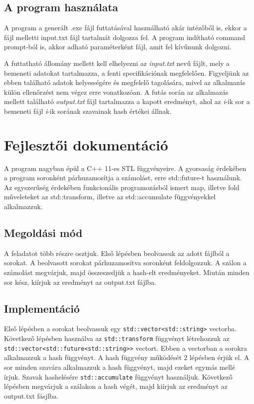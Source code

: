\documentclass[12pt]{article}
\begin{document}
\subsection{A program használata}

A program a generált .exe fájl futtatásával használható akár intézőből is, ekkor a fájl melletti input.txt fájl tartalmát dolgozza fel. A program indítható command prompt-ból is, akkor adható paraméterként fájl, amit fel kívűnunk dolgozni. 

A futtatható állomány mellett kell elhelyezni az \textit{input.txt} nevű fájlt, mely a bemeneti adatokat tartalmazza, a fenti specifikációnak megfelelően. Figyeljünk az ebben található adatok helyességére és megfelelő tagolására, mivel az alkalmazás külön ellenőrzést nem végez erre vonatkozóan. A futás során az alkalmazás mellett található \textit{output.txt} fájl tartalmazza a kapott eredményt, ahol az \textit{i}-ik sor a bemeneti fájl \textit{i}-ik sorának szavainak hash értékei állnak.

\section{Fejlesztői dokumentáció}

A program nagyban épül a C++ 11-es STL függvényeire. A gyorsaság érdekében a program soronként párhuzamosítja a számolást, erre std::future-t használunk. Az egyszerűség érdekében funkcionális programozásból ismert map, illetve fold műveleteket az std::transform, illetve az std::accumulate függvényekkel alkalmazzuk. 

\subsection{Megoldási mód}

A feladatot több részre osztjuk. Első lépésben beolvassuk az adott fájlból a sorokat. A beolvasott sorokat párhuzamosítva soronként feldolgozzuk. A szálon a számolást megvárjuk, majd összeszedjük a hash-elt eredményeket. Miután minden sor kész, kiírjuk az eredményt az output.txt fájlba.

\subsection{Implementáció}

Első lépésben a sorokat beolvassuk egy \verb|std::vector<std::string>| vectorba. Következő lépésben használva az \verb|std::transform| függvényt létrehozzuk az \verb|std::vector<std::future<std::string>>| vectort. Ebben a vectorban a sorokra alkalmazzuk a hash függvényt. A hash függvény működését 2 lépésben érjük el. A sor minden szavára alkalmazzuk a hash függvényt, majd ezeket egymás mellé írjuk. Szavak hashelésére \verb|std::accumulate| függvényt használjuk. Következő lépésben megvárjuk a szálakon a hash végét, majd kiírjuk az eredményt az output.txt fásjlba. 
\end{document}
